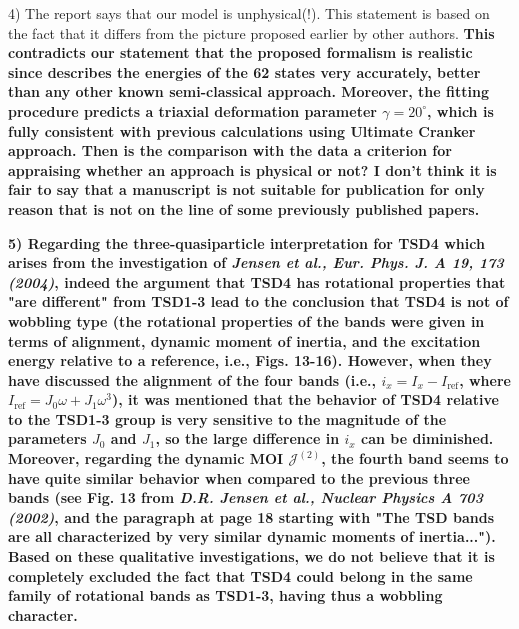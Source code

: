 \documentclass[11pt,a4paper]{article}
\begin{document}
4) The report says that our model is unphysical(!). This statement is based on the fact that it differs from the picture proposed earlier by other authors. \textbf{This contradicts our statement that the proposed formalism is realistic since describes the energies of the 62 states very accurately, better than any other known semi-classical approach. Moreover, the fitting procedure predicts a triaxial deformation parameter $\gamma=20^\circ$, which is fully consistent with previous calculations using Ultimate Cranker approach. Then is the comparison with the data a criterion for appraising whether an approach is physical or not? I don’t think it is fair to say that a manuscript is not suitable for publication for only reason that is not on the line of some previously published papers.}

\textbf{
5) Regarding the three-quasiparticle interpretation for TSD4 which arises from the investigation of \emph{Jensen et al., Eur. Phys. J. A 19, 173 (2004)}, indeed the argument that TSD4 has rotational properties that "are different" from TSD1-3 lead to the conclusion that TSD4 is not of wobbling type (the rotational properties of the bands were given in terms of alignment, dynamic moment of inertia, and the excitation energy relative to a reference, i.e., Figs. 13-16). However, when they have discussed the alignment of the four bands (i.e., $i_x=I_x-I_\text{ref}$, where $I_\text{ref}=J_0\omega+J_1\omega^3$), it was mentioned that the behavior of TSD4 relative to the TSD1-3 group is very sensitive to the magnitude of the parameters $J_0$ and $J_1$, so the large difference in $i_x$ can be diminished. Moreover, regarding the dynamic MOI $\mathcal{J}^{(2)}$, the fourth band seems to have quite similar behavior when compared to the previous three bands (see Fig. 13 from \emph{D.R. Jensen et al., Nuclear Physics A 703 (2002)}, and the paragraph at page 18 starting with "The TSD bands are all characterized by very similar dynamic moments of inertia..."). Based on these qualitative investigations, we do not believe that it is completely excluded the fact that TSD4 could belong in the same family of rotational bands as TSD1-3, having thus a wobbling character.}
\end{document}
